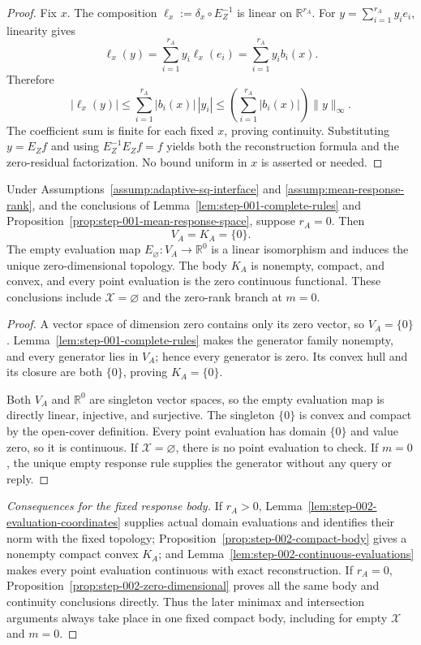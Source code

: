 \begin{proof}
Fix \(x\).  The composition \(\ell_x:=\delta_x\circ E_Z^{-1}\) is linear
on \(\mathbb R^{r_A}\).  For
\(y=\sum_{i=1}^{r_A}y_ie_i\), linearity gives
\[
\ell_x(y)=\sum_{i=1}^{r_A}y_i\ell_x(e_i)
=\sum_{i=1}^{r_A}y_i b_i(x).
\]
Therefore
\[
|\ell_x(y)|
\le\sum_{i=1}^{r_A}|b_i(x)|\,|y_i|
\le\left(\sum_{i=1}^{r_A}|b_i(x)|\right)\|y\|_\infty.
\]
The coefficient sum is finite for each fixed \(x\), proving continuity.
Substituting \(y=E_Zf\) and using \(E_Z^{-1}E_Zf=f\) yields both the
reconstruction formula and the zero-residual factorization.  No bound uniform
in \(x\) is asserted or needed.
\end{proof}

\begin{proposition}
\label{prop:step-002-zero-dimensional}
Under Assumptions~\ref{assump:adaptive-sq-interface} and
\ref{assump:mean-response-rank}, and the conclusions of
Lemma~\ref{lem:step-001-complete-rules} and
Proposition~\ref{prop:step-001-mean-response-space}, suppose \(r_A=0\).
Then
\[
V_A=K_A=\{0\}.
\]
The empty evaluation map \(E_\varnothing:V_A\to\mathbb R^0\) is a linear
isomorphism and induces the unique zero-dimensional topology.  The body
\(K_A\) is nonempty, compact, and convex, and every point evaluation is the
zero continuous functional.  These conclusions include
\(\mathcal X=\varnothing\) and the zero-rank branch at \(m=0\).
\end{proposition}

\begin{proof}
A vector space of dimension zero contains only its zero vector, so
\(V_A=\{0\}\).  Lemma~\ref{lem:step-001-complete-rules} makes the generator
family nonempty, and every generator lies in \(V_A\); hence every generator
is zero.  Its convex hull and its closure are both \(\{0\}\), proving
\(K_A=\{0\}\).

Both \(V_A\) and \(\mathbb R^0\) are singleton vector spaces, so the empty
evaluation map is directly linear, injective, and surjective.  The singleton
\(\{0\}\) is convex and compact by the open-cover definition.  Every point
evaluation has domain \(\{0\}\) and value zero, so it is continuous.  If
\(\mathcal X=\varnothing\), there is no point evaluation to check.  If
\(m=0\), the unique empty response rule supplies the generator without any
query or reply.
\end{proof}

\begin{proof}[Consequences for the fixed response body]
If \(r_A>0\), Lemma~\ref{lem:step-002-evaluation-coordinates} supplies actual
domain evaluations and identifies their norm with the fixed topology;
Proposition~\ref{prop:step-002-compact-body} gives a nonempty compact convex
\(K_A\); and Lemma~\ref{lem:step-002-continuous-evaluations} makes every
point evaluation continuous with exact reconstruction.  If \(r_A=0\),
Proposition~\ref{prop:step-002-zero-dimensional} proves all the same body and
continuity conclusions directly.  Thus the later minimax and intersection
arguments always take place in one fixed compact body, including for empty
\(\mathcal X\) and \(m=0\).
\end{proof}

